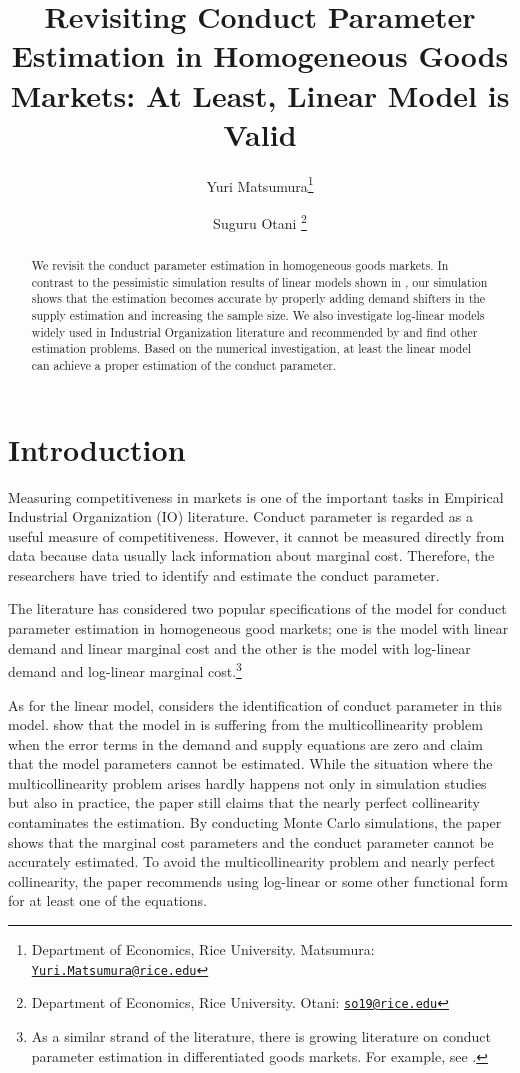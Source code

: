 \documentclass[11pt, a4paper]{article}
\title{Revisiting Conduct Parameter Estimation in Homogeneous Goods Markets: At Least, Linear Model is Valid}
\author{Yuri Matsumura\footnote{Department of Economics, Rice University. Matsumura: \texttt{\href{mailto:Yuri.Matsumura@rice.edu}{Yuri.Matsumura@rice.edu}}} \and Suguru Otani \footnote{Department of Economics, Rice University. Otani: \texttt{\href{mailto:so19@rice.edu}{so19@rice.edu}}}}
\begin{document}
\maketitle

\begin{abstract}
    We revisit the conduct parameter estimation in homogeneous goods markets. In contrast to the pessimistic simulation results of linear models shown in \cite{perloff2012collinearity}, our simulation shows that the estimation becomes accurate by properly adding demand shifters in the supply estimation and increasing the sample size. We also investigate log-linear models widely used in Industrial Organization literature and recommended by \cite{perloff2012collinearity} and find other estimation problems. Based on the numerical investigation, at least the linear model can achieve a proper estimation of the conduct parameter.
\end{abstract}

\section{Introduction}

Measuring competitiveness in markets is one of the important tasks in Empirical Industrial Organization (IO) literature.
Conduct parameter is regarded as a useful measure of competitiveness. 
However, it cannot be measured directly from data because data usually lack information about marginal cost.
Therefore, the researchers have tried to identify and estimate the conduct parameter.

The literature has considered two popular specifications of the model for conduct parameter estimation in homogeneous good markets; one is the model with linear demand and linear marginal cost and the other is the model with log-linear demand and log-linear marginal cost.\footnote{As a similar strand of the literature, there is growing literature on conduct parameter estimation in differentiated goods markets. For example, see \cite{gandhi2021empirical}.}

As for the linear model, \citet{bresnahan1982oligopoly} considers the identification of conduct parameter in this model. 
\citet{perloff2012collinearity} show that the model in \citet{bresnahan1982oligopoly} is suffering from the multicollinearity problem when the error terms in the demand and supply equations are zero and claim that the model parameters cannot be estimated.
While the situation where the multicollinearity problem arises hardly happens not only in simulation studies but also in practice, the paper still claims that the nearly perfect collinearity contaminates the estimation.
By conducting Monte Carlo simulations, the paper shows that the marginal cost parameters and the conduct parameter cannot be accurately estimated.
To avoid the multicollinearity problem and nearly perfect collinearity, the paper recommends using log-linear or some other functional form for at least one of the equations.
\end{document}
